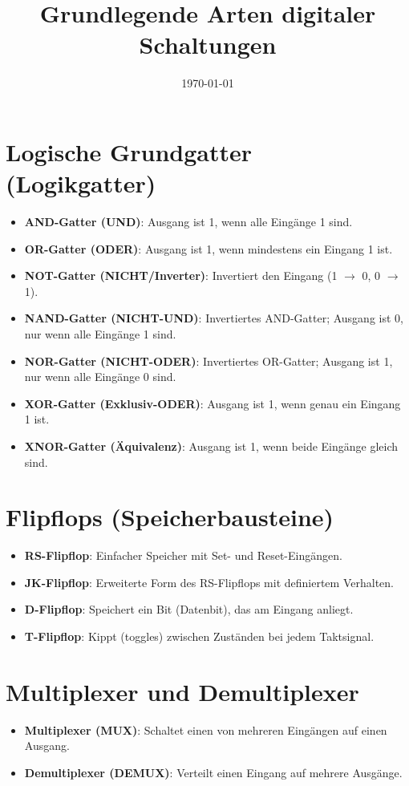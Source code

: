 \documentclass[a4paper,12pt]{article}
\begin{document}
	
	\title{Grundlegende Arten digitaler Schaltungen}
	\author{}
	\date{\today}
	
	\maketitle
	
	\section{Logische Grundgatter (Logikgatter)}
	\begin{itemize}
		\item \textbf{AND-Gatter (UND)}: Ausgang ist 1, wenn alle Eingänge 1 sind.
		\item \textbf{OR-Gatter (ODER)}: Ausgang ist 1, wenn mindestens ein Eingang 1 ist.
		\item \textbf{NOT-Gatter (NICHT/Inverter)}: Invertiert den Eingang (1 $\rightarrow$ 0, 0 $\rightarrow$ 1).
		\item \textbf{NAND-Gatter (NICHT-UND)}: Invertiertes AND-Gatter; Ausgang ist 0, nur wenn alle Eingänge 1 sind.
		\item \textbf{NOR-Gatter (NICHT-ODER)}: Invertiertes OR-Gatter; Ausgang ist 1, nur wenn alle Eingänge 0 sind.
		\item \textbf{XOR-Gatter (Exklusiv-ODER)}: Ausgang ist 1, wenn genau ein Eingang 1 ist.
		\item \textbf{XNOR-Gatter (Äquivalenz)}: Ausgang ist 1, wenn beide Eingänge gleich sind.
	\end{itemize}
	
	\section{Flipflops (Speicherbausteine)}
	\begin{itemize}
		\item \textbf{RS-Flipflop}: Einfacher Speicher mit Set- und Reset-Eingängen.
		\item \textbf{JK-Flipflop}: Erweiterte Form des RS-Flipflops mit definiertem Verhalten.
		\item \textbf{D-Flipflop}: Speichert ein Bit (Datenbit), das am Eingang anliegt.
		\item \textbf{T-Flipflop}: Kippt (toggles) zwischen Zuständen bei jedem Taktsignal.
	\end{itemize}
	
	\section{Multiplexer und Demultiplexer}
	\begin{itemize}
		\item \textbf{Multiplexer (MUX)}: Schaltet einen von mehreren Eingängen auf einen Ausgang.
		\item \textbf{Demultiplexer (DEMUX)}: Verteilt einen Eingang auf mehrere Ausgänge.
	\end{itemize}
	
\end{document}
